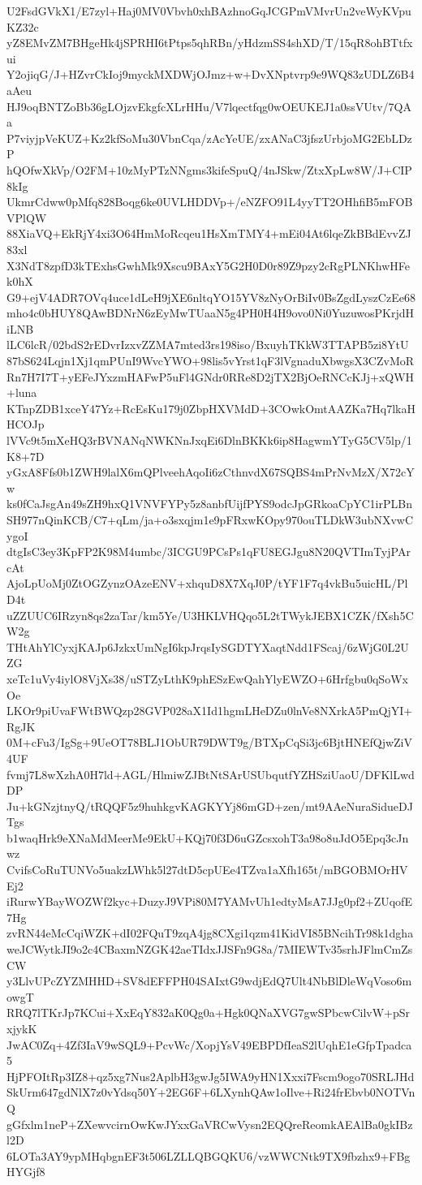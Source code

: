 U2FsdGVkX1/E7zyl+Haj0MV0Vbvh0xhBAzhnoGqJCGPmVMvrUn2veWyKVpuKZ32c
yZ8EMvZM7BHgeHk4jSPRHI6tPtps5qhRBn/yHdzmSS4shXD/T/15qR8ohBTtfxui
Y2ojiqG/J+HZvrCkIoj9myckMXDWjOJmz+w+DvXNptvrp9e9WQ83zUDLZ6B4aAeu
HJ9oqBNTZoBb36gLOjzvEkgfcXLrHHu/V7lqectfqg0wOEUKEJ1a0ssVUtv/7QAa
P7viyjpVeKUZ+Kz2kfSoMu30VbnCqa/zAcYeUE/zxANaC3jfszUrbjoMG2EbLDzP
hQOfwXkVp/O2FM+10zMyPTzNNgms3kifeSpuQ/4nJSkw/ZtxXpLw8W/J+CIP8kIg
UkmrCdww0pMfq828Boqg6ke0UVLHDDVp+/eNZFO91L4yyTT2OHhfiB5mFOBVPlQW
88XiaVQ+EkRjY4xi3O64HmMoRcqeu1HsXmTMY4+mEi04At6lqeZkBBdEvvZJ83xl
X3NdT8zpfD3kTExhsGwhMk9Xscu9BAxY5G2H0D0r89Z9pzy2cRgPLNKhwHFek0hX
G9+ejV4ADR7OVq4uce1dLeH9jXE6nltqYO15YV8zNyOrBiIv0BsZgdLyszCzEe68
mho4c0bHUY8QAwBDNrN6zEyMwTUaaN5g4PH0H4H9ovo0Ni0YuzuwosPKrjdHiLNB
lLC6lcR/02bdS2rEDvrIzxvZZMA7mted3rs198iso/BxuyhTKkW3TTAPB5zi8YtU
87bS624Lqjn1Xj1qmPUnI9WvcYWO+98lis5vYrst1qF3lVgnaduXbwgsX3CZvMoR
Rn7H7I7T+yEFeJYxzmHAFwP5uFl4GNdr0RRe8D2jTX2BjOeRNCcKJj+xQWH+luna
KTnpZDB1xceY47Yz+RcEsKu179j0ZbpHXVMdD+3COwkOmtAAZKa7Hq7lkaHHCOJp
lVVc9t5mXeHQ3rBVNANqNWKNnJxqEi6DlnBKKk6ip8HagwmYTyG5CV5lp/1K8+7D
yGxA8Ffs0b1ZWH9lalX6mQPlveehAqoIi6zCthnvdX67SQBS4mPrNvMzX/X72cYw
ks0fCaJsgAn49sZH9hxQ1VNVFYPy5z8anbfUijfPYS9odcJpGRkoaCpYC1irPLBn
SH977nQinKCB/C7+qLm/ja+o3sxqjm1e9pFRxwKOpy970ouTLDkW3ubNXvwCygoI
dtgIsC3ey3KpFP2K98M4umbc/3ICGU9PCsPs1qFU8EGJgu8N20QVTImTyjPArcAt
AjoLpUoMj0ZtOGZynzOAzeENV+xhquD8X7XqJ0P/tYF1F7q4vkBu5uicHL/PlD4t
uZZUUC6IRzyn8qs2zaTar/km5Ye/U3HKLVHQqo5L2tTWykJEBX1CZK/fXsh5CW2g
THtAhYlCyxjKAJp6JzkxUmNgI6kpJrqsIySGDTYXaqtNdd1FScaj/6zWjG0L2UZG
xeTc1uVy4iylO8VjXs38/uSTZyLthK9phESzEwQahYlyEWZO+6Hrfgbu0qSoWxOe
LKOr9piUvaFWtBWQzp28GVP028aX1Id1hgmLHeDZu0lnVe8NXrkA5PmQjYI+RgJK
0M+cFu3/IgSg+9UeOT78BLJ1ObUR79DWT9g/BTXpCqSi3jc6BjtHNEfQjwZiV4UF
fvmj7L8wXzhA0H7ld+AGL/HlmiwZJBtNtSArUSUbqutfYZHSziUaoU/DFKlLwdDP
Ju+kGNzjtnyQ/tRQQF5z9huhkgvKAGKYYj86mGD+zen/mt9AAeNuraSidueDJTgs
b1waqHrk9eXNaMdMeerMe9EkU+KQj70f3D6uGZcsxohT3a98o8uJdO5Epq3cJnwz
CvifsCoRuTUNVo5uakzLWhk5l27dtD5cpUEe4TZva1aXfh165t/mBGOBMOrHVEj2
iRurwYBayWOZWf2kyc+DuzyJ9VPi80M7YAMvUh1edtyMsA7JJg0pf2+ZUqofE7Hg
zvRN44eMcCqiWZK+dI02FQuT9zqA4jg8CXgi1qzm41KidVI85BNcihTr98k1dgha
weJCWytkJI9o2c4CBaxmNZGK42aeTIdxJJSFn9G8a/7MIEWTv35srhJFlmCmZsCW
y3LlvUPcZYZMHHD+SV8dEFFPH04SAIxtG9wdjEdQ7Ult4NbBlDleWqVoso6mowgT
RRQ7lTKrJp7KCui+XxEqY832aK0Qg0a+Hgk0QNaXVG7gwSPbcwCilvW+pSrxjykK
JwAC0Zq+4Zf3IaV9wSQL9+PcvWc/XopjYsV49EBPDfIeaS2lUqhE1eGfpTpadca5
HjPFOItRp3IZ8+qz5xg7Nus2AplbH3gwJg5IWA9yHN1Xxxi7Fscm9ogo70SRLJHd
SkUrm647gdNlX7z0vYdsq50Y+2EG6F+6LXynhQAw1oIlve+Ri24frEbvb0NOTVnQ
gGfxlm1neP+ZXewvcirnOwKwJYxxGaVRCwVysn2EQQreReomkAEAlBa0gkIBzl2D
6LOTa3AY9ypMHqbgnEF3t506LZLLQBGQKU6/vzWWCNtk9TX9fbzhx9+FBgHYGjf8
